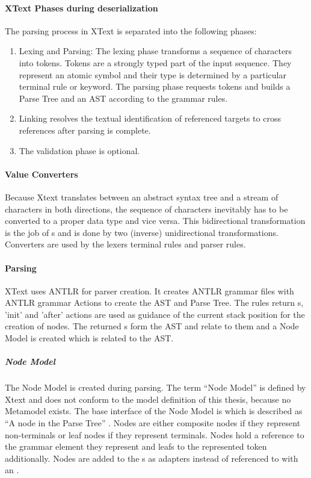 \paragraph{XText Phases during deserialization}
The parsing process in XText is separated into the following phases:
\begin{enumerate}
	\item Lexing and Parsing: The lexing phase transforms a sequence of characters into tokens. Tokens are a strongly typed part of the input sequence. They represent an atomic symbol and their type is determined by a particular terminal rule or keyword. The parsing phase requests tokens and builds a Parse Tree and an AST according to the grammar rules.
	\item Linking resolves the textual identification of referenced targets to cross references after parsing is complete.
	\item The validation phase is optional.
\end{enumerate}

\paragraph{Value Converters}
Because Xtext translates between an abstract syntax tree and a stream of characters in both directions, the sequence of characters inevitably has to be converted to a proper data type and vice versa. This bidirectional transformation is the job of s and is done by two (inverse) unidirectional transformations. Converters are used by the lexers terminal rules and parser rules.


\paragraph{Parsing}
XText uses ANTLR \cite{ANTLR} for parser creation. It creates ANTLR grammar files with ANTLR grammar Actions to create the AST and Parse Tree. The rules return s, 'init' and 'after' actions are used as guidance of the current stack position for the creation of nodes. The returned s form the AST and relate to them and a Node Model is created which is related to the AST. 

\subparagraph{Node Model}
The Node Model is created during parsing. The term ``Node Model'' is defined by Xtext and does not conform to the model definition of this thesis, because no Metamodel exists. The base interface of the Node Model is  which  is described as ``A node in the Parse Tree'' \cite{XTextAPI}. Nodes are either composite nodes if they represent non-terminals or leaf nodes if they represent terminals. Nodes hold a reference to the grammar element they represent and leafs to the represented token additionally. Nodes are added to the s as adapters instead of referenced to with an .

